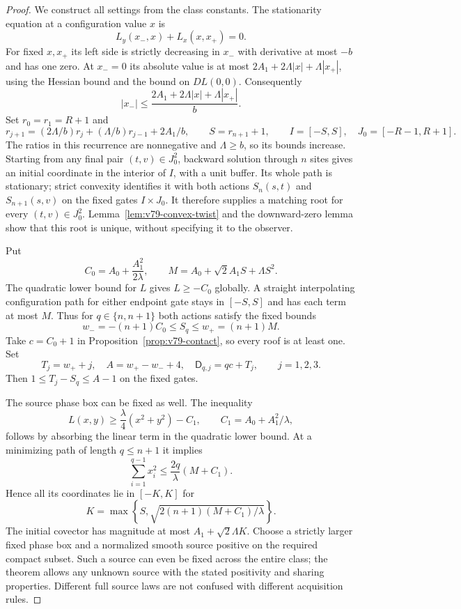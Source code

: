 \begin{proof}
We construct all settings from the class constants.  The stationarity
equation at a configuration value $x$ is
\[
                    L_y(x_-,x)+L_x(x,x_+)=0.
\]
For fixed $x,x_+$ its left side is strictly decreasing in $x_-$ with
derivative at most $-b$ and has one zero.  At $x_-=0$ its absolute
value is at most $2A_1+2\Lambda|x|+\Lambda|x_+|$, using the
Hessian bound and the bound on $DL(0,0)$.  Consequently
\begin{equation}\label{eq:v79-backward-bound}
 |x_-|\le\frac{2A_1+2\Lambda|x|+\Lambda|x_+|}{b}.
\end{equation}
Set $r_0=r_1=R+1$ and
\[
 r_{j+1}=(2\Lambda/b)r_j+(\Lambda/b)r_{j-1}+2A_1/b,
 \qquad S=r_{n+1}+1,
 \qquad I=[-S,S],\quad J_0=[-R-1,R+1].
\]
The ratios in this recurrence are nonnegative and $\Lambda\ge b$,
so its bounds increase.  Starting from any final pair
$(t,v)\in J_0^2$, backward solution through $n$ sites gives an
initial coordinate in the interior of $I$, with a unit buffer.
Its whole path is stationary; strict convexity identifies it with
both actions $S_n(s,t)$ and $S_{n+1}(s,v)$ on the fixed gates
$I\times J_0$.  It therefore supplies a matching root for every
$(t,v)\in J_0^2$.  Lemma~\ref{lem:v79-convex-twist} and the downward-zero
lemma show that this root is unique, without specifying it to the observer.

Put
\[
 C_0=A_0+\frac{A_1^2}{2\lambda},\qquad
 M=A_0+\sqrt2 A_1S+\Lambda S^2.
\]
The quadratic lower bound for $L$ gives $L\ge-C_0$ globally.
A straight interpolating configuration path for either endpoint gate
stays in $[-S,S]$ and has each term at most $M$.  Thus for
$q\in\{n,n+1\}$ both actions satisfy the fixed bounds
\[
       w_-=-(n+1)C_0\le S_q\le w_+=(n+1)M.
\]
Take $c=C_0+1$ in Proposition~\ref{prop:v79-contact}, so every roof
is at least one.  Set
\begin{equation}\label{eq:v79-deadlines}
 T_j=w_++j,\quad A=w_+-w_-+4,\quad
 \mathsf D_{q,j}=qc+T_j,\qquad j=1,2,3.
\end{equation}
Then $1\le T_j-S_q\le A-1$ on the fixed gates.

The source phase box can be fixed as well.  The inequality
\[
 L(x,y)\ge\frac{\lambda}{4}(x^2+y^2)-C_1,
       \qquad C_1=A_0+A_1^2/\lambda,
\]
follows by absorbing the linear term in the quadratic lower bound.
At a minimizing path of length $q\le n+1$ it implies
\[
 \sum_{i=1}^{q-1}x_i^2
       \le\frac{2q}{\lambda}(M+C_1).
\]
Hence all its coordinates lie in $[-K,K]$ for
\[
 K=\max\left\{S,
          \sqrt{2(n+1)(M+C_1)/\lambda}\right\}.
\]
The initial covector has magnitude at most $A_1+\sqrt2\Lambda K$.
Choose a strictly larger fixed phase box and a normalized smooth source
positive on the required compact subset.  Such a source can even be
fixed across the entire class; the theorem allows any unknown source
with the stated positivity and sharing properties.  Different full
source laws are not confused with different acquisition rules.


\end{proof}
